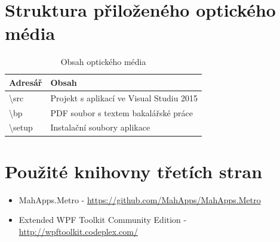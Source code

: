 \documentclass[czech,bachelor,public,dept460,male,oneside]{diploma}
\begin{document}
\appendix
\section{Struktura přiloženého optického média}
\begin{table}[h!]
	\centering
	\caption{Obsah optického média}
	\begin{tabular}{l l}
		\toprule
		Adresář & Obsah \\
		\midrule
		\textbackslash src & Projekt s aplikací ve Visual Studiu 2015 \\
		\textbackslash bp & PDF soubor s textem bakalářské práce \\
		\textbackslash setup & Instalační soubory aplikace \\
		\midrule
	\end{tabular}
\end{table}

\section{Použité knihovny třetích stran}
\begin{itemize}
	\item MahApps.Metro - \url{https://github.com/MahApps/MahApps.Metro}
	\item Extended WPF Toolkit Community Edition - \url{http://wpftoolkit.codeplex.com/}
\end{itemize}

\end{document}
